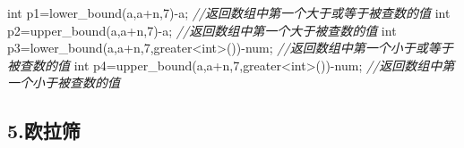 \documentclass[
]{article}
\newenvironment{Shaded}{}{}
\newcommand{\CommentTok}[1]{\textcolor[rgb]{0.38,0.63,0.69}{\textit{#1}}}
\newcommand{\DataTypeTok}[1]{\textcolor[rgb]{0.56,0.13,0.00}{#1}}
\newcommand{\DecValTok}[1]{\textcolor[rgb]{0.25,0.63,0.44}{#1}}
\newcommand{\NormalTok}[1]{#1}
\newcommand{\OperatorTok}[1]{\textcolor[rgb]{0.40,0.40,0.40}{#1}}
\begin{document}
\begin{Shaded}
\begin{Highlighting}[]
	\DataTypeTok{int}\NormalTok{ p1}\OperatorTok{=}\NormalTok{lower\_bound}\OperatorTok{(}\NormalTok{a}\OperatorTok{,}\NormalTok{a}\OperatorTok{+}\NormalTok{n}\OperatorTok{,}\DecValTok{7}\OperatorTok{){-}}\NormalTok{a}\OperatorTok{;}    \CommentTok{//返回数组中第一个大于或等于被查数的值}
    \DataTypeTok{int}\NormalTok{ p2}\OperatorTok{=}\NormalTok{upper\_bound}\OperatorTok{(}\NormalTok{a}\OperatorTok{,}\NormalTok{a}\OperatorTok{+}\NormalTok{n}\OperatorTok{,}\DecValTok{7}\OperatorTok{){-}}\NormalTok{a}\OperatorTok{;}    \CommentTok{//返回数组中第一个大于被查数的值}
    \DataTypeTok{int}\NormalTok{ p3}\OperatorTok{=}\NormalTok{lower\_bound}\OperatorTok{(}\NormalTok{a}\OperatorTok{,}\NormalTok{a}\OperatorTok{+}\NormalTok{n}\OperatorTok{,}\DecValTok{7}\OperatorTok{,}\NormalTok{greater}\OperatorTok{\textless{}}\DataTypeTok{int}\OperatorTok{\textgreater{}()){-}}\NormalTok{num}\OperatorTok{;}  \CommentTok{//返回数组中第一个小于或等于被查数的值}
    \DataTypeTok{int}\NormalTok{ p4}\OperatorTok{=}\NormalTok{upper\_bound}\OperatorTok{(}\NormalTok{a}\OperatorTok{,}\NormalTok{a}\OperatorTok{+}\NormalTok{n}\OperatorTok{,}\DecValTok{7}\OperatorTok{,}\NormalTok{greater}\OperatorTok{\textless{}}\DataTypeTok{int}\OperatorTok{\textgreater{}()){-}}\NormalTok{num}\OperatorTok{;}  \CommentTok{//返回数组中第一个小于被查数的值}
\end{Highlighting}
\end{Shaded}

\hypertarget{5ux6b27ux62c9ux7b5b}{%
\subsection{5.欧拉筛}\label{5ux6b27ux62c9ux7b5b}}
\end{document}
